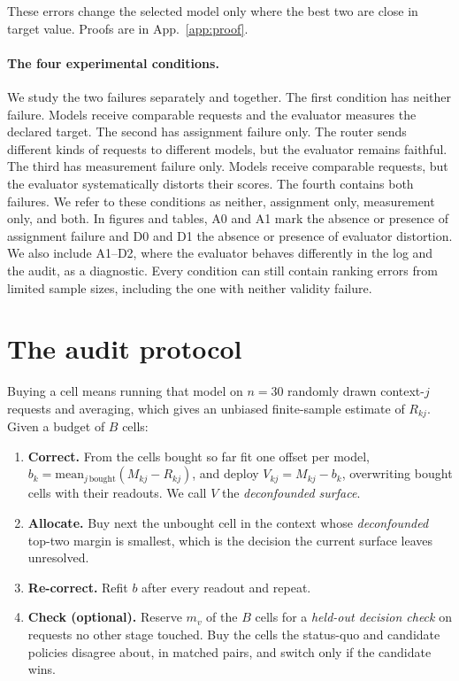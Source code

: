 \documentclass{article}
\theoremstyle{plain}
\theoremstyle{remark}
\begin{document}
These errors change the selected model only where the best two are close in target value. Proofs are
in App.~\ref{app:proof}.

\paragraph{The four experimental conditions.} We study the two failures separately and together. The
first condition has neither failure. Models receive comparable requests and the evaluator measures
the declared target. The second has assignment failure only. The router sends different kinds of
requests to different models, but the evaluator remains faithful. The third has measurement failure
only. Models receive comparable requests, but the evaluator systematically distorts their scores. The
fourth contains both failures. We refer to these conditions as neither, assignment only, measurement
only, and both. In figures and tables, A0 and A1 mark the absence or presence of assignment failure
and D0 and D1 the absence or presence of evaluator distortion. We also include A1--D2, where the
evaluator behaves differently in the log and the audit, as a diagnostic. Every condition can still
contain ranking errors from limited sample sizes, including the one with neither validity failure.

\section{The audit protocol}\label{sec:protocol}
Buying a cell means running that model on $n{=}30$ randomly drawn context-$j$ requests and averaging,
which gives an unbiased finite-sample estimate of $R_{kj}$. Given a budget of $B$ cells:

\begin{enumerate}[leftmargin=1.4em,itemsep=1pt,topsep=2pt]
\item \textbf{Correct.} From the cells bought so far fit one offset per model,
$b_k=\mathrm{mean}_{j\,\mathrm{bought}}(M_{kj}-R_{kj})$, and deploy $V_{kj}=M_{kj}-b_k$, overwriting
bought cells with their readouts. We call $V$ the \emph{deconfounded surface}.
\item \textbf{Allocate.} Buy next the unbought cell in the context whose \emph{deconfounded} top-two
margin is smallest, which is the decision the current surface leaves unresolved.
\item \textbf{Re-correct.} Refit $b$ after every readout and repeat.
\item \textbf{Check (optional).} Reserve $m_v$ of the $B$ cells for a \emph{held-out decision check}
on requests no other stage touched. Buy the cells the status-quo and candidate policies disagree
about, in matched pairs, and switch only if the candidate wins.
\end{enumerate}
\end{document}
